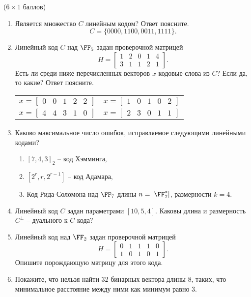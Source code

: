 \documentclass[12pt,a4paper]{scrartcl}
\newcounter{auf}
\newcommand{\auf}[2]
{
\stepcounter{auf}{\textbf{Задание} \textbf{\arabic{auf}} } ({#1} баллов) \vspace{3pt}

#2

\newpage %
}
\begin{document}
\auf{$6 \times 1 $}{%

\begin{enumerate}[1]
	\setlength\itemsep{13em}
	\item Является множество $C$ линейным кодом? Ответ поясните.
	\[
		C = \{ 0000, 1100, 0011, 1111 \}.
	\]
	\item Линейный код $C$ над $\FF_5$  задан проверочной матрицей
	\[
		H = \begin{bmatrix}
		1&2&0&1&4\\ 
		3&1&1&2&1
		\end{bmatrix}.
	\]
	Есть ли среди ниже перечисленных векторов $x$ кодовые слова из $C$? Если да, то какие? Ответ поясните. \\
	
	\begin{tabular}{ p{7cm} p{7cm}  }
	$x = \left[ \begin {array}{ccccc} 0&0&1&2&2\end {array} \right]  $ 	 & $x = \left[ \begin {array}{ccccc} 1&0&1&0&2\end {array} \right]  $ \\[3ex]
		$x = \left[ \begin {array}{ccccc} 4&4&3&1&0\end {array} \right] $ & $x = \left[ \begin {array}{ccccc} 2&3&0&1&1\end {array} \right] $ 
	\end{tabular}

	\item Каково максимальное число ошибок, исправляемое следующими линейными кодами?
	\begin{enumerate}
		\setlength\itemsep{1em}
		\item $[7,4,3]_2$ -- код Хэмминга,
		\item $[2^r, r, 2^{r-1}]$ -- код Адамара,
		\item Код Рида-Соломона над $\FF_{7}$ длины $n = |\FF^*_{7}|$, размерности $k = 4$.
	\end{enumerate}	

	\item Линейный код $C$ задан параметрами $[10, 5, 4]$. Каковы длина и размерность $C^\perp$ -- дуального к $C$ кода?

	\item Линейный код над $\FF_2$ задан проверочной матрицей 	
	\[
	H = \begin{bmatrix}
		0&1&1&1&0\\ 
		1&0&1&0&1
	\end{bmatrix}.
	\]
	Опишите порождающую матрицу для этого кода.
	
	\item Покажите, что нельзя найти 32 бинарных вектора длины 8, таких, что минимальное расстояние между ними как минимум равно 3.
	
	
\end{enumerate}

}
\newpage
\end{document}
